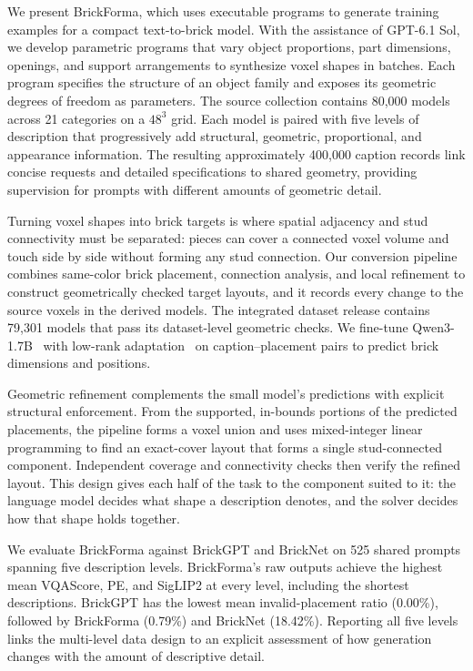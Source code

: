 We present BrickForma, which uses executable programs to generate training examples for a compact text-to-brick model. With the assistance of GPT-6.1 Sol, we develop parametric programs that vary object proportions, part dimensions, openings, and support arrangements to synthesize voxel shapes in batches. Each program specifies the structure of an object family and exposes its geometric degrees of freedom as parameters. The source collection contains 80,000 models across 21 categories on a $48^3$ grid. Each model is paired with five levels of description that progressively add structural, geometric, proportional, and appearance information. The resulting approximately 400,000 caption records link concise requests and detailed specifications to shared geometry, providing supervision for prompts with different amounts of geometric detail.

Turning voxel shapes into brick targets is where spatial adjacency and stud connectivity must be separated: pieces can cover a connected voxel volume and touch side by side without forming any stud connection. Our conversion pipeline combines same-color brick placement, connection analysis, and local refinement to construct geometrically checked target layouts, and it records every change to the source voxels in the derived models. The integrated dataset release contains 79,301 models that pass its dataset-level geometric checks. We fine-tune Qwen3-1.7B~\cite{qwen3} with low-rank adaptation~\cite{lora} on caption--placement pairs to predict brick dimensions and positions.

Geometric refinement complements the small model's predictions with explicit structural enforcement. From the supported, in-bounds portions of the predicted placements, the pipeline forms a voxel union and uses mixed-integer linear programming to find an exact-cover layout that forms a single stud-connected component. Independent coverage and connectivity checks then verify the refined layout. This design gives each half of the task to the component suited to it: the language model decides what shape a description denotes, and the solver decides how that shape holds together.

We evaluate BrickForma against BrickGPT and BrickNet on 525 shared prompts spanning five description levels. BrickForma's raw outputs achieve the highest mean VQAScore, PE, and SigLIP2 at every level, including the shortest descriptions. BrickGPT has the lowest mean invalid-placement ratio (0.00\%), followed by BrickForma (0.79\%) and BrickNet (18.42\%). Reporting all five levels links the multi-level data design to an explicit assessment of how generation changes with the amount of descriptive detail.

